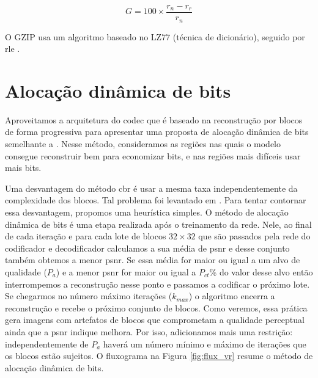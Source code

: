 \begin{equation}
\label{eq:gain_ce}
G = 100 \times \frac{r_n-r_r}{r_n}
\end{equation}


O GZIP usa um algoritmo baseado no LZ77 (técnica de dicionário), seguido por \acrshort{rle} \cite{sayood2017introduction}. 


\section{Alocação dinâmica de bits}\label{sec:adb}

Aproveitamos a arquitetura do \acrshort{codec} que é baseado na reconstrução por blocos de forma progressiva para apresentar uma proposta de alocação dinâmica de bits semelhante a \cite{Priming2017Johnston}. Nesse método, consideramos as regiões nas quais o modelo consegue reconstruir bem para economizar bits, e nas regiões  mais difíceis usar mais bits. 


Uma desvantagem do método \acrshort{cbr} é usar a mesma taxa independentemente da complexidade dos blocos. Tal problema foi levantado em \cite{Priming2017Johnston}. Para tentar contornar essa desvantagem, propomos uma heurística simples.
O método de alocação dinâmica de bits é uma etapa realizada após o treinamento da rede. Nele, ao final de cada iteração e para cada lote de blocos $32 \times 32$ que são passados pela rede do codificador e decodificador calculamos a sua média de \acrshort{psnr} e desse conjunto também obtemos a menor \acrshort{psnr}. Se essa média for maior ou igual a um alvo de qualidade ($P_{a}$) e a menor \acrshort{psnr} for maior ou igual a $P_{ct}$\% do valor desse alvo então interrompemos a reconstrução nesse ponto e passamos a codificar o próximo lote. Se chegarmos no número máximo iterações ($k_{max}$) o algoritmo encerra a reconstrução e recebe o próximo conjunto de blocos.
Como veremos, essa prática gera imagens com artefatos de blocos  que comprometam a qualidade perceptual ainda que a \acrshort{psnr} indique melhora. Por isso, adicionamos mais uma restrição: independentemente de $P_{a}$ haverá um número mínimo e máximo de iterações que os blocos estão sujeitos. O fluxograma na Figura \ref{fig:flux_vr} resume o método de alocação dinâmica de bits. 


